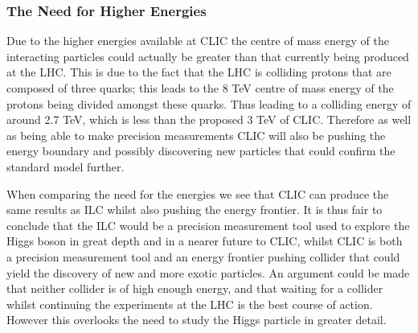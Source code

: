%
%

\subsubsection{The Need for Higher Energies}
\label{higherEnergies}
Due to the higher energies available at CLIC the centre of mass energy of the interacting particles could actually be greater than that currently being produced at the LHC. This is due to the fact that the LHC is colliding protons that are composed of three quarks; this leads to the 8 TeV centre of mass energy \cite{ATLAS:8TeV} of the protons being divided amongst these quarks. Thus leading to a colliding energy of around 2.7 TeV, which is less than the proposed 3 TeV of CLIC. Therefore as well as being able to make precision measurements CLIC will also be pushing the energy boundary and possibly discovering new particles that could confirm the standard model further.

When comparing the need for the energies we see that CLIC can produce the same results as ILC whilst also pushing the energy frontier. It is thus fair to conclude that the ILC would be a precision measurement tool used to explore the Higgs boson in great depth and in a nearer future to CLIC, whilst CLIC is both a precision measurement tool and an energy frontier pushing collider that could yield the discovery of new and more exotic particles. An argument could be made that neither collider is of high enough energy, and that waiting for a collider whilst continuing the experiments at the LHC is the best course of action. However this overlooks the need to study the Higgs particle in greater detail.

